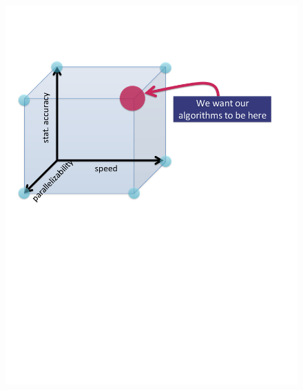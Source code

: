 \documentclass[12pt]{report}
\begin{document}
\begin{figure}
\centering
\includegraphics[scale=0.5]{./support/tradeoff.pdf}
\label{fig:tradeoff}
\end{figure}
\end{document}
